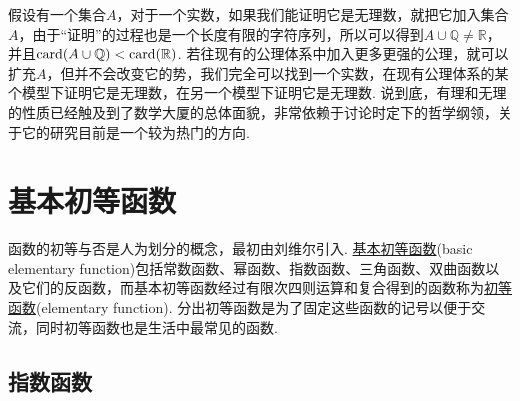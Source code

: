 \documentclass[UTF8]{ctexart}
\newcommand{\trm}[1]{{\rm #1}}
\begin{document}
假设有一个集合\(A\)，对于一个实数，如果我们能证明它是无理数，就把它加入集合\(A\)，由于“证明”的过程也是一个长度有限的字符序列，所以可以得到\(A\cup\mathbb{Q}\neq \mathbb{R}\)，并且\(\trm{card}(A\cup\mathbb{Q})<\trm{card}(\mathbb{R})\). 若往现有的公理体系中加入更多更强的公理，就可以扩充\(A\)，但并不会改变它的势，我们完全可以找到一个实数，在现有公理体系的某个模型下证明它是无理数，在另一个模型下证明它是无理数. 说到底，有理和无理的性质已经触及到了数学大厦的总体面貌，非常依赖于讨论时定下的哲学纲领，关于它的研究目前是一个较为热门的方向.

\section{基本初等函数}

函数的初等与否是人为划分的概念，最初由刘维尔引入. \uline{基本初等函数}(basic elementary function)包括常数函数、幂函数、指数函数、三角函数、双曲函数以及它们的反函数，而基本初等函数经过有限次四则运算和复合得到的函数称为\uline{初等函数}(elementary function). 分出初等函数是为了固定这些函数的记号以便于交流，同时初等函数也是生活中最常见的函数. 

\subsection{指数函数}
\end{document}
